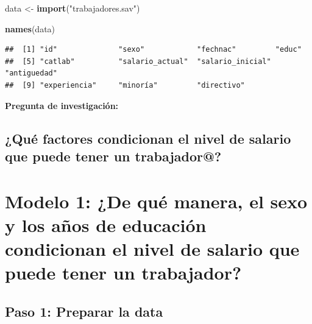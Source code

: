 \documentclass[
]{article}
\newenvironment{Shaded}{\begin{snugshade}}{\end{snugshade}}
\newcommand{\FunctionTok}[1]{\textcolor[rgb]{0.13,0.29,0.53}{\textbf{#1}}}
\newcommand{\NormalTok}[1]{#1}
\newcommand{\OtherTok}[1]{\textcolor[rgb]{0.56,0.35,0.01}{#1}}
\newcommand{\StringTok}[1]{\textcolor[rgb]{0.31,0.60,0.02}{#1}}
\begin{document}
\begin{Shaded}
\begin{Highlighting}[]
\NormalTok{data }\OtherTok{\textless{}{-}} \FunctionTok{import}\NormalTok{(}\StringTok{"trabajadores.sav"}\NormalTok{)}
\end{Highlighting}
\end{Shaded}

\begin{Shaded}
\begin{Highlighting}[]
\FunctionTok{names}\NormalTok{(data)}
\end{Highlighting}
\end{Shaded}

\begin{verbatim}
##  [1] "id"              "sexo"            "fechnac"         "educ"           
##  [5] "catlab"          "salario_actual"  "salario_inicial" "antiguedad"     
##  [9] "experiencia"     "minoría"         "directivo"
\end{verbatim}

\textbf{Pregunta de investigación:}

\hypertarget{quuxe9-factores-condicionan-el-nivel-de-salario-que-puede-tener-un-trabajador}{%
\subsection{\texorpdfstring{\textbf{¿Qué factores condicionan el nivel
de salario que puede tener un
trabajador@?}}{¿Qué factores condicionan el nivel de salario que puede tener un trabajador@?}}\label{quuxe9-factores-condicionan-el-nivel-de-salario-que-puede-tener-un-trabajador}}

\hypertarget{modelo-1-de-quuxe9-manera-el-sexo-y-los-auxf1os-de-educaciuxf3n-condicionan-el-nivel-de-salario-que-puede-tener-un-trabajador}{%
\section{\texorpdfstring{Modelo 1: \textbf{¿De qué manera, el sexo y los
años de educación condicionan el nivel de salario que puede tener un
trabajador?}}{Modelo 1: ¿De qué manera, el sexo y los años de educación condicionan el nivel de salario que puede tener un trabajador?}}\label{modelo-1-de-quuxe9-manera-el-sexo-y-los-auxf1os-de-educaciuxf3n-condicionan-el-nivel-de-salario-que-puede-tener-un-trabajador}}

\hypertarget{paso-1-preparar-la-data}{%
\subsection{\texorpdfstring{\textbf{Paso 1: Preparar la
data}}{Paso 1: Preparar la data}}\label{paso-1-preparar-la-data}}
\end{document}
